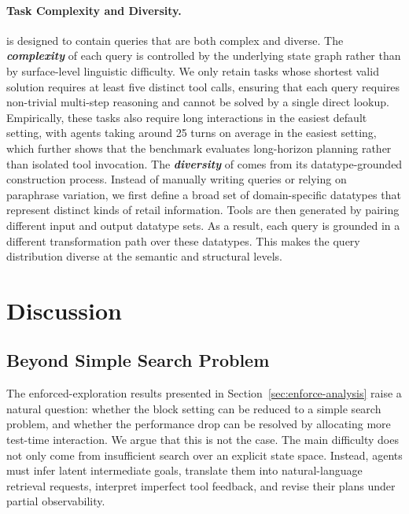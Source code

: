 \paragraph{Task Complexity and Diversity.} 
\bench{} is designed to contain queries that are both complex and diverse. 
The \textbf{\textit{complexity}} of each query is controlled by the underlying state graph rather than by surface-level linguistic difficulty.
We only retain tasks whose shortest valid solution requires at least five distinct tool calls, ensuring that each query requires non-trivial multi-step reasoning and cannot be solved by a single direct lookup. 
Empirically, these tasks also require long interactions in the easiest default setting, with agents taking around 25 turns on average in the easiest setting, which further shows that the benchmark evaluates long-horizon planning rather than isolated tool invocation.
The \textbf{\textit{diversity}} of \bench{} comes from its datatype-grounded construction process. 
Instead of manually writing queries or relying on paraphrase variation, we first define a broad set of domain-specific datatypes that represent distinct kinds of retail information. 
Tools are then generated by pairing different input and output datatype sets. 
As a result, each query is grounded in a different transformation path over these datatypes. 
This makes the query distribution diverse at the semantic and structural levels.

\section{Discussion}
\label{app:discussion}

\subsection{Beyond Simple Search Problem}
\label{app:why-is-not-a-search-problem}

The enforced-exploration results presented in Section~\ref{sec:enforce-analysis} raise a natural question: whether the block setting can be reduced to a simple search problem, and whether the performance drop can be resolved by allocating more test-time interaction.
We argue that this is not the case. 
The main difficulty does not only come from insufficient search over an explicit state space. 
Instead, agents must infer latent intermediate goals, translate them into natural-language retrieval requests, interpret imperfect tool feedback, and revise their plans under partial observability.

